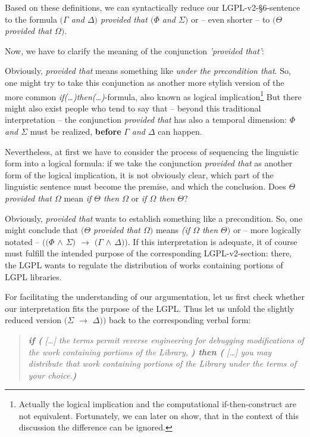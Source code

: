 Based on these definitions, we can syntactically reduce our LGPL-v2-§6-sentence
to the formula \emph{$(\Gamma$ and $\Delta)$ provided that $(\Phi$ and
$\Sigma)$} or -- even shorter -- to \emph{$(\Theta$ provided that
$\Omega)$}.

Now, we have to clarify the meaning of the conjunction \emph{'provided that'}:

Obviously, \emph{provided that} means something like \emph{under the
precondition that}. So, one might try to take this conjunction as another more
stylish version of the more common \emph{if(\ldots)then(\ldots)}-formula, also
known as logical implication\footnote{Actually the logical implication and the
computational if-then-construct are not equivalent. Fortunately, we can later on
show, that in the context of this discussion the difference can be ignored.} But
there might also exist people who tend to say that -- beyond this traditional
interpretation -- the conjunction \emph{provided that} has also a temporal
dimension: \emph{$\Phi$ and $\Sigma$} must be realized, \textbf{before}
\emph{$\Gamma$ and $\Delta$} can happen.

Nevertheless, at first we have to consider the process of sequencing the
linguistic form into a logical formula: if we take the conjunction
\emph{provided that} as another form of the logical implication, it is not
obviously clear, which part of the  linguistic sentence must become the premise,
and which the conclusion. Does \emph{$\Theta$ provided that $\Omega$} mean
\emph{if $\Theta$ then $\Omega$} or \emph{if $\Omega$ then $\Theta$}?

Obviously, \emph{provided that} wants to establish something like a
precondition. So, one might conclude that \emph{$(\Theta$ provided that
$\Omega)$} means \emph{(if $\Omega$ then $\Theta)$} or -- more logically notated
-- \emph{$((\Phi$ $\wedge$ $\Sigma)$ $\rightarrow$ $(\Gamma$ $\wedge$
$\Delta))$}. If this interpretation is adequate, it of course must fulfill the
intended purpose of the corresponding LGPL-v2-section: there, the LGPL wants to
regulate the distribution of works containing portions of LGPL libraries.

For facilitating the understanding of our argumentation, let us first check
whether our interpretation fits the purpose of the LGPL. Thus let us unfold the
slightly reduced version \emph{$(\Sigma$ $\rightarrow$ $\Delta))$} back to the
corresponding verbal form:

\begin{quote}\noindent\emph{\textbf{if (} [\ldots] the terms permit reverse
engineering for debugging modifications of the work containing portions of the
Library, \textbf{) then (} [\ldots] you may distribute that work containing
portions of the Library under the terms of your choice.\textbf{)}}\end{quote}


